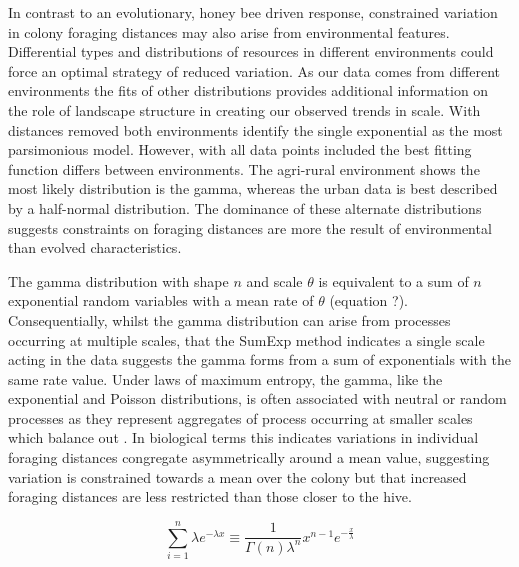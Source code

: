 \documentclass[11pt,usenames,dvipsnames]{article}
\begin{document}
\begin{linenumbers}
In contrast to an evolutionary, honey bee driven response, constrained variation in colony foraging distances may also arise from environmental features. Differential types and distributions of resources in different environments could force an optimal strategy of reduced variation. As our data comes from different environments the fits of other distributions provides additional information on the role of landscape structure in creating our observed trends in scale. With distances removed both environments identify the single exponential as the most parsimonious model. However, with all data points included the best fitting function differs between environments. The agri-rural environment shows the most likely distribution is the gamma, whereas the urban data is best described by a half-normal distribution. The dominance of these alternate distributions suggests constraints on foraging distances are more the result of environmental than evolved characteristics.

The gamma distribution with shape $n$ and scale $\theta$ is equivalent to a sum of $n$ exponential random variables with a mean rate of $\theta$ (equation ?). Consequentially, whilst the gamma distribution can arise from processes occurring at multiple scales, that the SumExp method indicates a single scale acting in the data suggests the gamma forms from a sum of exponentials with the same rate value. Under laws of maximum entropy, the gamma, like the exponential and Poisson distributions, is often associated with neutral or random processes as they represent aggregates of process occurring at smaller scales which balance out \citep{Frank2009}. In biological terms this indicates variations in individual foraging distances congregate asymmetrically around a mean value, suggesting variation is constrained towards a mean over the colony but that increased foraging distances are less restricted than those closer to the hive.
\end{linenumbers}

\begin{equation}
\sum_{i=1}^{n} \lambda e^{-\lambda x} \equiv \frac{1}{\Gamma(n)\lambda^n}x^{n-1}e^{-\frac{x}{\lambda}}
\end{equation}
\end{document}
